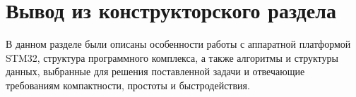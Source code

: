 \section{Вывод из конструкторского раздела}
В данном разделе были описаны особенности работы с аппаратной платформой STM32, структура программного комплекса, а также алгоритмы и 
структуры данных, выбранные для решения поставленной задачи и отвечающие требованиям компактности, простоты и быстродействия.



